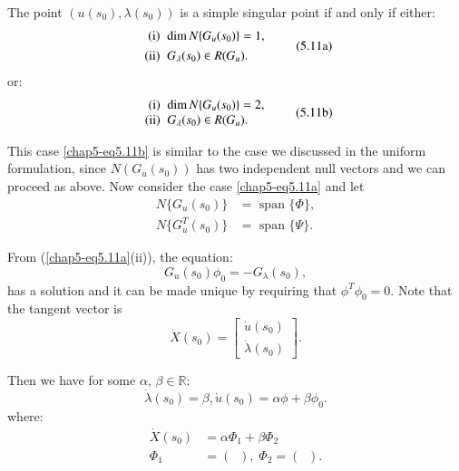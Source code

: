\setcounter{chaplemma}{10}
\begin{chaplemma}\label{chap5-lem5.11}%
The point $(u(s_0), \lambda(s_0))$ is a simple singular point if
  and only if either: 
\begin{equation*}
\begin{array}{r@{\;\;}l}
\text{\rm(i)} &  \dim N\{G_u(s_0)\}=1,\\[4pt]
\text{\rm(ii)}  & G_\lambda (s_0) \in R(G_u). 
\end{array}\tag{5.11a}\label{chap5-eq5.11a}
\end{equation*}
or:
\begin{equation*}
\begin{array}{r@{\;\;}l}
 \text{\rm(i)} & \dim N\{G_u(s_0)\}=2,\\
\text{\rm(ii)}  & G_\lambda (s_0) \in R(G_u). 
\end{array}\tag{5.11b}\label{chap5-eq5.11b}
\end{equation*}
\end{chaplemma}

This case \eqref{chap5-eq5.11b} is similar to the case we discussed in
the uniform 
formulation, since $N(G_u(s_0))$ has two independent null vectors
and\pageoriginale 
we can proceed as above. Now consider the case \eqref{chap5-eq5.11a} and let  
\begin{align*}
N\{G_u(s_0)\} & = \text{ span }\{\Phi\},\\[4pt]
N\{G^T_u(s_0)\} & = \text{ span }\{\Psi\}.
\end{align*}

From (\ref{chap5-eq5.11a}(ii)), the equation:
$$
G_u(s_0)\phi_0=-G_\lambda(s_0),
$$
has a solution and it can be made unique by requiring that $\phi^T
\phi_0=0$. Note that the tangent vector is  
\begin{equation*}
\dot{X}(s_0)=
\begin{bmatrix}
\dot{u}(s_0)\\
\dot{\lambda} (s_0)
\end{bmatrix}.
\end{equation*}

Then we have for some $\alpha$, $\beta \in \mathbb{R}$: 
$$
\dot{\lambda} (s_0)=\beta, \dot{u}(s_0) = \alpha \phi + \beta \phi_0.
$$
where:
\begin{align*}
\dot{X}(s_0) & =\alpha \Phi_1 + \beta \Phi_2 \\
\Phi_1 & = \left(\displaystyle{\mathop{{}^{\phi}_0}} \right), \; 
 \Phi_2 =
\left(\displaystyle{\mathop{{}^{\phi_0}_1}} \right).
\end{align*}

